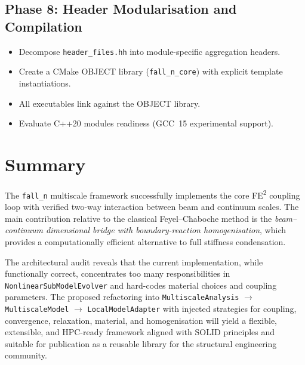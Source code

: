 \subsection{Phase 8: Header Modularisation and Compilation}
\label{sec:ms-plan-phase8}

\begin{itemize}
  \item Decompose \texttt{header\_files.hh} into module-specific
    aggregation headers.
  \item Create a CMake OBJECT library
    (\texttt{fall\_n\_core}) with explicit template instantiations.
  \item All executables link against the OBJECT library.
  \item Evaluate C++20 modules readiness (GCC~15 experimental
    support).
\end{itemize}


\section{Summary}
\label{sec:ms-arch-summary}

The \texttt{fall\_n} multiscale framework successfully implements the
core FE\textsuperscript{2} coupling loop with verified two-way
interaction between beam and continuum scales.  The main contribution
relative to the classical Feyel--Chaboche method is the
\emph{beam--continuum dimensional bridge with boundary-reaction
homogenisation}, which provides a computationally efficient
alternative to full stiffness condensation.

The architectural audit reveals that the current implementation,
while functionally correct, concentrates too many responsibilities
in \texttt{NonlinearSubModelEvolver} and hard-codes material choices
and coupling parameters.  The proposed refactoring into
\texttt{MultiscaleAnalysis} $\to$ \texttt{MultiscaleModel} $\to$
\texttt{LocalModelAdapter} with injected strategies for coupling,
convergence, relaxation, material, and homogenisation will yield a
flexible, extensible, and HPC-ready framework aligned with SOLID
principles and suitable for publication as a reusable library for
the structural engineering community.



